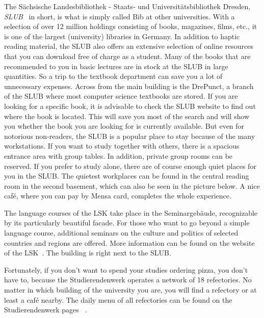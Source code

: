 \label{sec:slub}
The Sächsische Landesbibliothek - Staats- und Universitätsbibliothek Dresden, \emph{SLUB}~ in short, is what is simply called Bib at other universities.
With a selection of over 12 million holdings consisting of books, magazines, films, etc., it is one of the largest (university) libraries in Germany. In addition to haptic reading material, the SLUB also offers an extensive selection of online resources that you can download free of charge as a student. Many of the books that are recommended to you in basic lectures are in stock at the SLUB in large quantities. So a trip to the textbook department can save you a lot of unnecessary expenses. Across from the main building is the DrePunct, a branch of the SLUB where most computer science textbooks are stored. If you are looking for a specific book, it is advisable to check the SLUB website to find out where the book is located. This will save you most of the search and will show you whether the book you are looking for is currently available.\newline
But even for notorious non-readers, the SLUB is a popular place to stay because of the many workstations. If you want to study together with others, there is a spacious entrance area with group tables. In addition, private group rooms can be reserved. If you prefer to study alone, there are of course enough quiet places for you in the SLUB\@. The quietest workplaces can be found in the central reading room in the second basement, which can also be seen in the picture below. A nice café, where you can pay by Mensa card, completes the whole experience.

\newpage
{}
The language courses of the LSK take place in the Seminargebäude, recognizable by its particularly beautiful facade. For those who want to go beyond a simple language course, additional seminars on the culture and politics of selected countries and regions are offered. More information can be found on the website of the LSK~.
The building is right next to the SLUB.

Fortunately, if you don't want to spend your studies ordering pizza, you don't have to, because the Studierendenwerk operates a network of 18 refectories.
No matter in which building of the university you are, you will find a refectory or at least a café nearby.
The daily menu of all refectories can be found on the Studierendenwerk pages ~.

